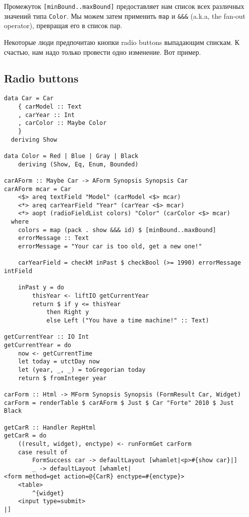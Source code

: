 Промежуток \lstinline'[minBound..maxBound]' предоставляет нам список всех различных
значений типа \lstinline'Color'. Мы можем затем применить \lstinline'map' и 
\lstinline'&&&' (a.k.a, the fan-out operator), превращая его в список пар.

Некоторые люди предпочитаю кнопки radio buttons 
выпадающим спискам. К счастью, нам надо только провести одно изменение. Вот пример.

\subsection{Radio buttons}
\begin{lstlisting}
data Car = Car
    { carModel :: Text
    , carYear :: Int
    , carColor :: Maybe Color
    }
  deriving Show

data Color = Red | Blue | Gray | Black
    deriving (Show, Eq, Enum, Bounded)

carAForm :: Maybe Car -> AForm Synopsis Synopsis Car
carAForm mcar = Car
    <$> areq textField "Model" (carModel <$> mcar)
    <*> areq carYearField "Year" (carYear <$> mcar)
    <*> aopt (radioFieldList colors) "Color" (carColor <$> mcar)
  where
    colors = map (pack . show &&& id) $ [minBound..maxBound]
    errorMessage :: Text
    errorMessage = "Your car is too old, get a new one!"

    carYearField = checkM inPast $ checkBool (>= 1990) errorMessage intField

    inPast y = do
        thisYear <- liftIO getCurrentYear
        return $ if y <= thisYear
            then Right y
            else Left ("You have a time machine!" :: Text)

getCurrentYear :: IO Int
getCurrentYear = do
    now <- getCurrentTime
    let today = utctDay now
    let (year, _, _) = toGregorian today
    return $ fromInteger year

carForm :: Html -> MForm Synopsis Synopsis (FormResult Car, Widget)
carForm = renderTable $ carAForm $ Just $ Car "Forte" 2010 $ Just Black

getCarR :: Handler RepHtml
getCarR = do
    ((result, widget), enctype) <- runFormGet carForm
    case result of
        FormSuccess car -> defaultLayout [whamlet|<p>#{show car}|]
        _ -> defaultLayout [whamlet|
<form method=get action=@{CarR} enctype=#{enctype}>
    <table>
        ^{widget}
    <input type=submit>
|]
\end{lstlisting}

